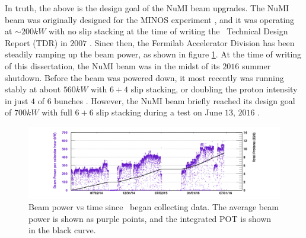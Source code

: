 In truth, the above is the design goal of the NuMI beam upgrades. The NuMI beam was originally designed for the MINOS experiment \cite{ref:TDRNuMI}, and it was operating at ${\sim}200\unit{kW}$ with no slip stacking at the time of writing the \nova~Technical Design Report (TDR) in $2007$ \cite{ref:TDRNOvA}. Since then, the Fermilab Accelerator Division has been steadily ramping up the beam power, as shown in figure \ref{fig:BeamPower}. At the time of writing of this dissertation, the NuMI beam was in the midst of its $2016$ summer shutdown. Before the beam was powered down, it most recently was running stably at about $560\unit{kW}$ with $6{+}4$ slip stacking, or doubling the proton intensity in just $4$ of $6$ bunches \cite{ref:IntensitykW, ref:IntensitySlip}. However, the NuMI beam briefly reached its design goal of $700\unit{kW}$ with full $6{+}6$ slip stacking during a test on June $13$, $2016$ \cite{ref:Intensity700}.
\begin{figure}[htb]
  \centering
  \includegraphics[width=1\textwidth]{figures/BeamPower.png}
  \caption[Beam Power vs Time]{Beam power vs time since \nova~began collecting data. The average beam power is shown as purple points, and the integrated POT is shown in the black curve.}
  \label{fig:BeamPower}
\end{figure}

